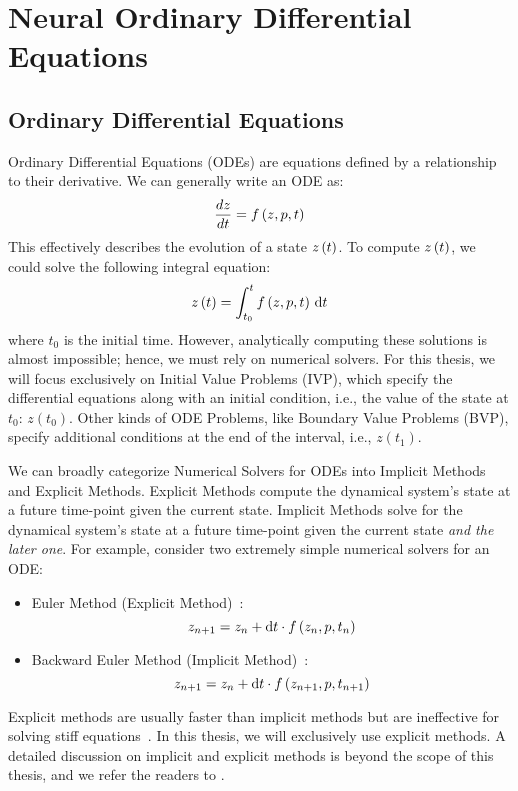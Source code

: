 \chapter{Neural Ordinary Differential Equations}
\label{chapter:neural_ode}

\section{Ordinary Differential Equations}
\label{sec:ordinary_differential_equations}

Ordinary Differential Equations (ODEs) are equations defined by a relationship to their derivative. We can generally write an ODE as:
%
\begin{equation}
  \frac{dz}{dt} = f\left(z, p, t\right)
\end{equation}
%
This effectively describes the evolution of a state $z\left(t\right)$. To compute $z\left(t\right)$, we could solve the following integral equation:
%
\begin{equation}
  z\left(t\right) = \int_{t_0}^{t} f\left(z, p, t\right) \, \mathrm{d}t
\end{equation}
%
where $t_0$ is the initial time. However, analytically computing these solutions is almost impossible; hence, we must rely on numerical solvers. For this thesis, we will focus exclusively on Initial Value Problems (IVP), which specify the differential equations along with an initial condition, i.e., the value of the state at $t_0$: $z(t_0)$. Other kinds of ODE Problems, like Boundary Value Problems (BVP), specify additional conditions at the end of the interval, i.e., $z(t_1)$.

We can broadly categorize Numerical Solvers for ODEs into Implicit Methods and Explicit Methods. Explicit Methods compute the dynamical system's state at a future time-point given the current state. Implicit Methods solve for the dynamical system's state at a future time-point given the current state \textit{and the later one}. For example, consider two extremely simple numerical solvers for an ODE:
%
\begin{itemize}
  \item Euler Method (Explicit Method)~\citep{euler1824institutionum}:
        \begin{equation}
          z_{n + 1} = z_n + \mathrm{d}t \cdot f\left(z_n, p, t_n\right)
        \end{equation}
  \item Backward Euler Method (Implicit Method)~\citep{euler1824institutionum}:
        \begin{equation}
          z_{n + 1} = z_n + \mathrm{d}t \cdot f\left(z_{n + 1}, p, t_{n + 1}\right)
        \end{equation}
\end{itemize}
%
Explicit methods are usually faster than implicit methods but are ineffective for solving stiff equations~\citep{wanner1996solving,kim2021stiff}. In this thesis, we will exclusively use explicit methods. A detailed discussion on implicit and explicit methods is beyond the scope of this thesis, and we refer the readers to \citet{rackauckas2019scimlbook}.

